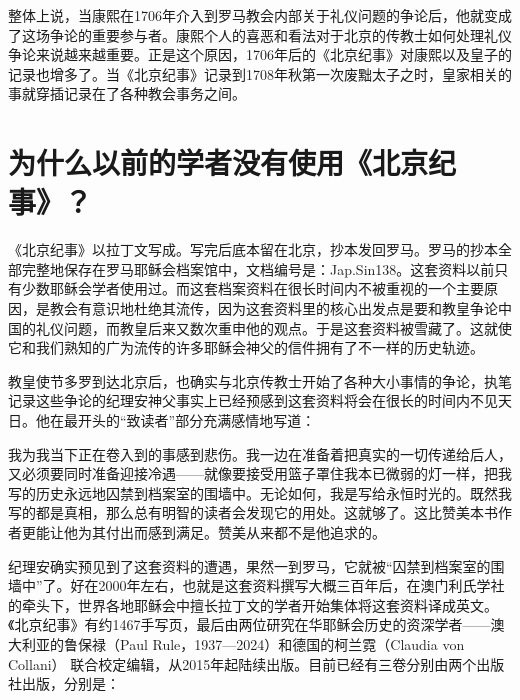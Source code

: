 
整体上说，当康熙在1706年介入到罗马教会内部关于礼仪问题的争论后，他就变成了这场争论的重要参与者。康熙个人的喜恶和看法对于北京的传教士如何处理礼仪争论来说越来越重要。正是这个原因，1706年后的《北京纪事》对康熙以及皇子的记录也增多了。当《北京纪事》记录到1708年秋第一次废黜太子之时，皇家相关的事就穿插记录在了各种教会事务之间。


\begin{sectionnotes}


\end{sectionnotes}
\section{为什么以前的学者没有使用《北京纪事》？}


《北京纪事》以拉丁文写成。写完后底本留在北京，抄本发回罗马。罗马的抄本全部完整地保存在罗马耶稣会档案馆中，文档编号是：Jap.Sin138。这套资料以前只有少数耶稣会学者使用过。而这套档案资料在很长时间内不被重视的一个主要原因，是教会有意识地杜绝其流传，因为这套资料里的核心出发点是要和教皇争论中国的礼仪问题，而教皇后来又数次重申他的观点。于是这套资料被雪藏了。这就使它和我们熟知的广为流传的许多耶稣会神父的信件拥有了不一样的历史轨迹。



教皇使节多罗到达北京后，也确实与北京传教士开始了各种大小事情的争论，执笔记录这些争论的纪理安神父事实上已经预感到这套资料将会在很长的时间内不见天日。他在最开头的“致读者”部分充满感情地写道：



\begin{bookquote}我为我当下正在卷入到的事感到悲伤。我一边在准备着把真实的一切传递给后人，又必须要同时准备迎接冷遇——就像要接受用篮子罩住我本已微弱的灯一样，把我写的历史永远地囚禁到档案室的围墙中。无论如何，我是写给永恒时光的。既然我写的都是真相，那么总有明智的读者会发现它的用处。这就够了。这比赞美本书作者更能让他为其付出而感到满足。赞美从来都不是他追求的。\end{bookquote}


纪理安确实预见到了这套资料的遭遇，果然一到罗马，它就被“囚禁到档案室的围墙中”了。好在2000年左右，也就是这套资料撰写大概三百年后，在澳门利氏学社的牵头下，世界各地耶稣会中擅长拉丁文的学者开始集体将这套资料译成英文。《北京纪事》有约1467手写页，最后由两位研究在华耶稣会历史的资深学者——澳大利亚的鲁保禄（Paul Rule，1937—2024）和德国的柯兰霓（Claudia von Collani） 联合校定编辑，从2015年起陆续出版。目前已经有三卷分别由两个出版社出版，分别是：


